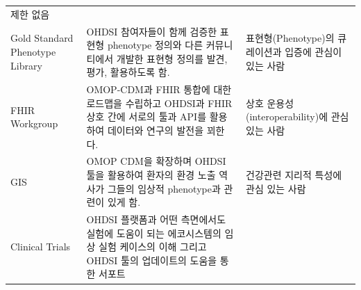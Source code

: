 \documentclass[11pt]{book}
\theoremstyle{definition}
\theoremstyle{definition}
\theoremstyle{definition}
\theoremstyle{remark}
\begin{document}
\begin{longtable}[]{@{}lll@{}}
\begin{minipage}[t]{0.37\columnwidth}
제한 없음\strut
\end{minipage}\tabularnewline
\begin{minipage}[t]{0.11\columnwidth}\raggedright\strut
Gold Standard Phenotype Library\strut
\end{minipage} & \begin{minipage}[t]{0.44\columnwidth}\raggedright\strut
OHDSI 참여자들이 함께 검증한 표현형 phenotype 정의와 다른 커뮤니티에서
개발한 표현형 정의를 발견, 평가, 활용하도록 함.\strut
\end{minipage} & \begin{minipage}[t]{0.37\columnwidth}\raggedright\strut
표현형(Phenotype)의 큐레이션과 입증에 관심이 있는 사람\strut
\end{minipage}\tabularnewline
\begin{minipage}[t]{0.11\columnwidth}\raggedright\strut
FHIR Workgroup\strut
\end{minipage} & \begin{minipage}[t]{0.44\columnwidth}\raggedright\strut
OMOP-CDM과 FHIR 통합에 대한 로드맵을 수립하고 OHDSI과 FHIR 상호 간에
서로의 툴과 API를 활용하여 데이터와 연구의 발전을 꾀한다.\strut
\end{minipage} & \begin{minipage}[t]{0.37\columnwidth}\raggedright\strut
상호 운용성(interoperability)에 관심 있는 사람\strut
\end{minipage}\tabularnewline
\begin{minipage}[t]{0.11\columnwidth}\raggedright\strut
GIS\strut
\end{minipage} & \begin{minipage}[t]{0.44\columnwidth}\raggedright\strut
OMOP CDM을 확장하며 OHDSI 툴을 활용하여 환자의 환경 노출 역사가 그들의
임상적 phenotype과 관련이 있게 함.\strut
\end{minipage} & \begin{minipage}[t]{0.37\columnwidth}\raggedright\strut
건강관련 지리적 특성에 관심 있는 사람\strut
\end{minipage}\tabularnewline
\begin{minipage}[t]{0.11\columnwidth}\raggedright\strut
Clinical Trials\strut
\end{minipage} & \begin{minipage}[t]{0.44\columnwidth}\raggedright\strut
OHDSI 플랫폼과 어떤 측면에서도 실험에 도움이 되는 에코시스템의 임상 실험
케이스의 이해 그리고 OHDSI 툴의 업데이트의 도움을 통한 서포트\strut
\end{minipage} & \begin{minipage}[t]{0.37\columnwidth}\raggedright\strut

\end{minipage}
\end{longtable}
\end{document}
